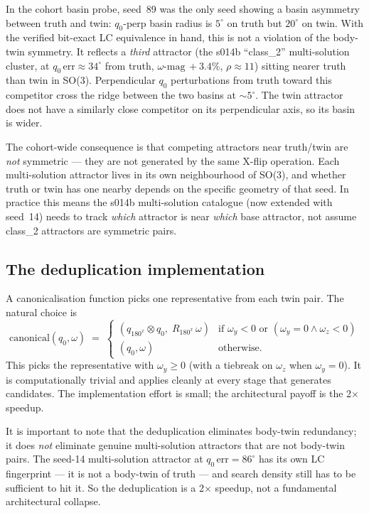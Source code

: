 \documentclass[11pt,a4paper]{article}
\begin{document}
In the cohort basin probe, seed~89 was the only seed showing a basin asymmetry between truth and twin: $q_0$-perp basin radius is $5^\circ$ on truth but $20^\circ$ on twin. With the verified bit-exact LC equivalence in hand, this is not a violation of the body-twin symmetry. It reflects a \emph{third} attractor (the s014b ``class\_2'' multi-solution cluster, at $q_0\,\mathrm{err}{\approx}34^\circ$ from truth, $\omega\text{-mag}\,{+}3.4\%$, $\rho{\approx}11$) sitting nearer truth than twin in SO(3). Perpendicular $q_0$ perturbations from truth toward this competitor cross the ridge between the two basins at $\sim 5^\circ$. The twin attractor does not have a similarly close competitor on its perpendicular axis, so its basin is wider.

The cohort-wide consequence is that competing attractors near truth/twin are \emph{not} symmetric --- they are not generated by the same X-flip operation. Each multi-solution attractor lives in its own neighbourhood of SO(3), and whether truth or twin has one nearby depends on the specific geometry of that seed. In practice this means the s014b multi-solution catalogue (now extended with seed~14) needs to track \emph{which} attractor is near \emph{which} base attractor, not assume class\_2 attractors are symmetric pairs.

\subsection{The deduplication implementation}

A canonicalisation function picks one representative from each twin pair. The natural choice is
\begin{equation}
\mathrm{canonical}(q_0, \omega) \;=\; \begin{cases}
(q_{180^x} \otimes q_0,\; R_{180^x}\,\omega) & \text{if } \omega_y < 0 \text{ or } (\omega_y = 0 \wedge \omega_z < 0) \\
(q_0, \omega) & \text{otherwise.}
\end{cases}
\end{equation}
This picks the representative with $\omega_y \geq 0$ (with a tiebreak on $\omega_z$ when $\omega_y = 0$). It is computationally trivial and applies cleanly at every stage that generates candidates. The implementation effort is small; the architectural payoff is the 2$\times$ speedup.

It is important to note that the deduplication eliminates body-twin redundancy; it does \emph{not} eliminate genuine multi-solution attractors that are not body-twin pairs. The seed-14 multi-solution attractor at $q_0\,\mathrm{err}{=}86^\circ$ has its own LC fingerprint --- it is not a body-twin of truth --- and search density still has to be sufficient to hit it. So the deduplication is a 2$\times$ speedup, not a fundamental architectural collapse.
\end{document}
